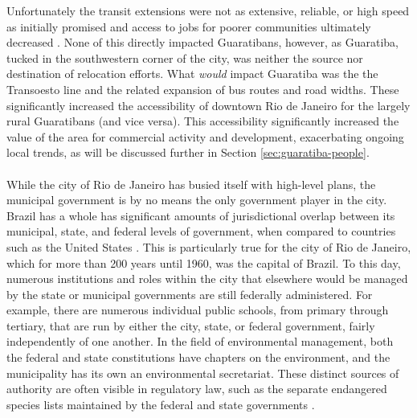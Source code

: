 Unfortunately the transit extensions were not as extensive, reliable, or high speed as initially promised \cite{wattsFuryFrustrationBrazil2014} and access to jobs for poorer communities ultimately decreased \cite{robertsonResultsAreCostly2017}. None of this directly impacted Guaratibans, however, as Guaratiba, tucked in the southwestern corner of the city, was neither the source nor destination of relocation efforts. What \textit{would} impact Guaratiba was the the Transoesto line and the related expansion of bus routes and road widths. These significantly increased the accessibility of downtown Rio de Janeiro for the largely rural Guaratibans (and vice versa). This accessibility significantly increased the value of the area for commercial activity and development, exacerbating ongoing local trends, as will be discussed further in Section \ref{sec:guaratiba-people}.

\paragraph{} \label{sec:rio-jurisdictions} \leavevmode\newline

While the city of Rio de Janeiro has busied itself with high-level plans, the municipal government is by no means the only government player in the city. Brazil has a whole has significant amounts of jurisdictional overlap between its municipal, state, and federal levels of government, when compared to countries such as the United States \cite{coutoImitationCoercionState2018}. This is particularly true for the city of Rio de Janeiro, which for more than 200 years until 1960, was the capital of Brazil. To this day, numerous institutions and roles within the city that elsewhere would be managed by the state or municipal governments are still federally administered. For example, there are numerous individual public schools, from primary through tertiary, that are run by either the city, state, or federal government, fairly independently of one another. In the field of environmental management, both the federal and state constitutions have chapters on the environment, and the municipality has its own an environmental secretariat. These distinct sources of authority are often visible in regulatory law, such as the separate endangered species lists maintained by the federal \cite{institutochicomendesdeconservacaodabiodiversidadeListaNacionalOficial2014} and state governments \cite{institutoestadualdoambienteListaEspeciesFauna}.

